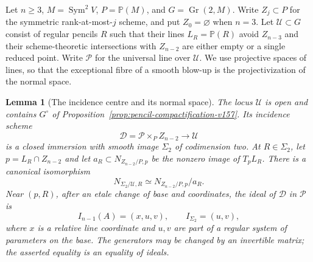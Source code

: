 \documentclass[11pt,reqno]{amsart}
\numberwithin{equation}{section}
\newtheorem{lemma}[theorem]{Lemma}
\theoremstyle{definition}\newtheorem{definition}[theorem]{Definition}
\theoremstyle{remark}\newtheorem{remark}[theorem]{Remark}
\newcommand{\Pj}{\mathbb P}\newcommand{\A}{\mathbb A}
\DeclareMathOperator{\Sym}{Sym}\DeclareMathOperator{\Gr}{Gr}
\begin{document}
Let $n\geq3$, $M=\Sym^2V$, $P=\Pj(M)$, and $G=\Gr(2,M)$.
Write $Z_j\subset P$ for the symmetric rank-at-most-$j$ scheme, and
put $Z_0=\varnothing$ when $n=3$. Let $\mathcal U\subset G$ consist
of regular pencils $R$ such that their lines $L_R=\Pj(R)$ avoid
$Z_{n-3}$ and their scheme-theoretic intersections with $Z_{n-2}$
are either empty or a single reduced point. Write $\mathcal P$ for
the universal line over $\mathcal U$. We use projective spaces of
lines, so that the exceptional fibre of a smooth blow-up is the
projectivization of the normal space.

\begin{lemma}[The incidence centre and its normal space]
\label{lem:incidence-centre-v160}
The locus $\mathcal U$ is open and contains $G^\circ$ of
Proposition~\ref{prop:pencil-compactification-v157}. Its incidence
scheme
\[
 \mathcal D=\mathcal P\times_P Z_{n-2}\longrightarrow\mathcal U
\]
is a closed immersion with smooth image $\Sigma_2$ of codimension two.
At $R\in\Sigma_2$, let $p=L_R\cap Z_{n-2}$ and let
$a_R\subset N_{Z_{n-2}/P,p}$ be the nonzero image of $T_pL_R$.
There is a canonical isomorphism
\begin{equation}\label{eq:incidence-normal-v160}
 N_{\Sigma_2/\mathcal U,R}
       \simeq N_{Z_{n-2}/P,p}/a_R.
\end{equation}
Near $(p,R)$, after an etale change of base and coordinates, the
ideal of $\mathcal D$ in $\mathcal P$ is
\begin{equation}\label{eq:incidence-local-v160}
       I_{n-1}(A)=(x,u,v),\qquad I_{\Sigma_2}=(u,v),
\end{equation}
where $x$ is a relative line coordinate and $u,v$ are part of a
regular system of parameters on the base. The generators may be
changed by an invertible matrix; the asserted equality is an equality
of ideals.
\end{lemma}
\end{document}
